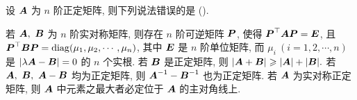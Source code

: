 \begin{example}
    设 $\vb*{A}$ 为 $n$ 阶正定矩阵, 则下列说法错误的是 (\quad).
    \begin{tasks}
        \task 若 $\vb*{A},~\vb*{B}$ 为 $n$ 阶实对称矩阵, 则存在 $n$ 阶可逆矩阵 $\vb*{P}$, 使得 $\vb*{P}^\top\vb*{AP}=\vb*{E}$, 且 $\vb*{P}^\top\vb*{BP}=\operatorname{diag} (\mu_1, \mu_2, \cdots, \mu_n)$, 其中 $\vb*{E}$ 是 $n$ 阶单位矩阵, 而 $\mu_i~(i=1,2, \cdots, n)$ 是 $|\lambda\vb*{A}-\vb*{B}|=0$ 的 $n$ 个实根.
        \task 若 $\vb*{B}$ 是正定矩阵, 则 $|\vb*{A}+\vb*{B}|\geqslant|\vb*{A}|+|\vb*{B}|.$
        \task 若 $\vb*{A},~\vb*{B},~\vb*{A}-\vb*{B}$ 均为正定矩阵, 则 $\vb*{A}^{-1}-\vb*{B}^{-1}$ 也为正定矩阵.
        \task 若 $\vb*{A}$ 为实对称正定矩阵, 则 $\vb*{A}$ 中元素之最大者必定位于 $\vb*{A}$ 的主对角线上.
    \end{tasks}
\end{example}
